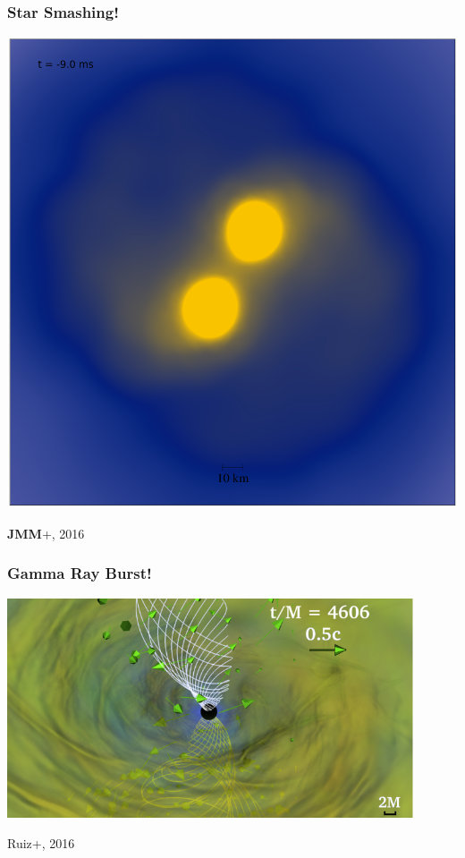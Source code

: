 \documentclass[]{beamer}
\begin{document}
\begin{frame}
  \frametitle{Star Smashing!}
  \begin{center}
    \includegraphics[height=0.8\textheight]{frames/betabin_000}
  \end{center}
    \textbf{JMM}+, 2016
\end{frame}

\begin{frame}
  \frametitle{Gamma Ray Burst!}
  \begin{center}
    \includegraphics[width=0.9\textwidth]{ruiz-2016}
  \end{center}
  Ruiz+, 2016
\end{frame}
\end{document}
